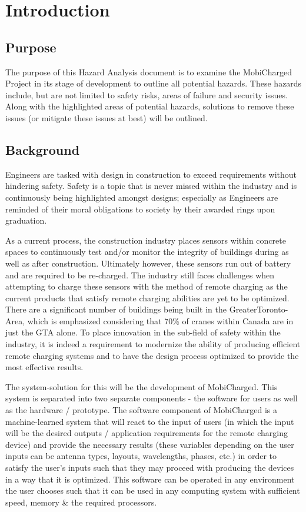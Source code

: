 \documentclass[12pt, titlepage]{article}
\begin{document}
\section{Introduction}

\subsection{Purpose}
The purpose of this Hazard Analysis document is to examine the MobiCharged Project in its stage of development to outline all potential hazards. These hazards include, but are not limited to safety risks, areas of failure and security issues. Along with the highlighted areas of potential hazards, solutions to remove these issues (or mitigate these issues at best) will be outlined.

\subsection{Background}
Engineers are tasked with design in construction to exceed requirements without hindering safety. Safety is a topic that is never missed within the industry and is continuously being highlighted amongst designs; especially as Engineers are reminded of their moral obligations to society by their awarded rings upon graduation. 
\par
As a current process, the construction industry places sensors within concrete spaces to continuously test and/or monitor the integrity of buildings during as well as after construction. Ultimately however, these sensors run out of battery and are required to be re-charged. 
The industry still faces challenges when attempting to charge these sensors with the method of remote charging as the current products that satisfy remote charging abilities are yet to be optimized. There are a significant number of buildings being built in the GreaterToronto-Area, which is emphasized considering that 70\% of cranes within Canada are in just the GTA alone. To place innovation in the sub-field of safety within the industry, it is indeed a requirement to modernize the ability of producing efficient remote charging systems and to have the design process optimized to provide the most effective results.
\par
The system-solution for this will be the development of MobiCharged. This system is separated into two separate components - the software for users as well as the hardware / prototype. 
The software component of MobiCharged is a machine-learned system that will react to the input of users (in which the input will be the desired outputs / application requirements for the remote charging device) and provide the necessary results (these variables depending on the user inputs can be antenna types, layouts, wavelengths, phases, etc.)  in order to satisfy the user’s inputs such that they may proceed with producing the devices in a way that it is optimized. This software can be operated in any environment the user chooses such that it can be used in any computing system with sufficient speed, memory & the required processors. 
\end{document}
